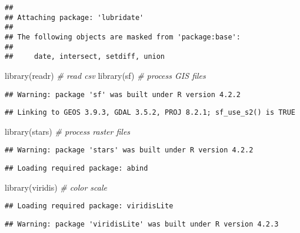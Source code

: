 \documentclass[
]{article}
\newenvironment{Shaded}{\begin{snugshade}}{\end{snugshade}}
\newcommand{\CommentTok}[1]{\textcolor[rgb]{0.56,0.35,0.01}{\textit{#1}}}
\newcommand{\FunctionTok}[1]{\textcolor[rgb]{0.00,0.00,0.00}{#1}}
\newcommand{\NormalTok}[1]{#1}
\begin{document}
\begin{verbatim}
## 
## Attaching package: 'lubridate'
## 
## The following objects are masked from 'package:base':
## 
##     date, intersect, setdiff, union
\end{verbatim}

\begin{Shaded}
\begin{Highlighting}[]
\FunctionTok{library}\NormalTok{(readr)      }\CommentTok{\# read csv}
\FunctionTok{library}\NormalTok{(sf)         }\CommentTok{\# process GIS files}
\end{Highlighting}
\end{Shaded}

\begin{verbatim}
## Warning: package 'sf' was built under R version 4.2.2
\end{verbatim}

\begin{verbatim}
## Linking to GEOS 3.9.3, GDAL 3.5.2, PROJ 8.2.1; sf_use_s2() is TRUE
\end{verbatim}

\begin{Shaded}
\begin{Highlighting}[]
\FunctionTok{library}\NormalTok{(stars)      }\CommentTok{\# process raster files}
\end{Highlighting}
\end{Shaded}

\begin{verbatim}
## Warning: package 'stars' was built under R version 4.2.2
\end{verbatim}

\begin{verbatim}
## Loading required package: abind
\end{verbatim}

\begin{Shaded}
\begin{Highlighting}[]
\FunctionTok{library}\NormalTok{(viridis)    }\CommentTok{\# color scale}
\end{Highlighting}
\end{Shaded}

\begin{verbatim}
## Loading required package: viridisLite
\end{verbatim}

\begin{verbatim}
## Warning: package 'viridisLite' was built under R version 4.2.3
\end{verbatim}
\end{document}
